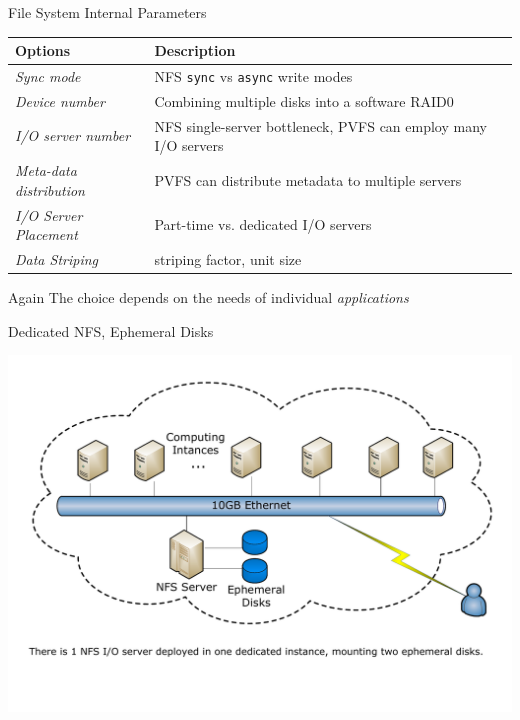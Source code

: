 \documentclass{beamer}
\begin{document}
\begin{frame}{File System Internal Parameters}
    \begin{tabular}{p{3.7cm}|p{6.3cm}}
        \toprule
        \textbf{Options} & \textbf{Description} \\
        \midrule
        \textit{Sync mode} &
            NFS \texttt{sync} vs \texttt{async} write modes \\
        \textit{Device number} &
            Combining multiple disks into a software RAID0 \\
        \textit{I/O server number} &
            NFS single-server bottleneck, PVFS can employ many I/O servers \\
        \textit{Meta-data distribution} &
            PVFS can distribute metadata to multiple servers \\
        \textit{I/O Server Placement} &
            Part-time vs. dedicated I/O servers \\
        \textit{Data Striping} & 
            striping factor, unit size\\
        \bottomrule
    \end{tabular}
    \vspace{.2cm}
    \pause
    \begin{block}{Again}
        The choice depends on the needs of individual \emph{applications}
    \end{block}
\end{frame}

\begin{frame}{Dedicated NFS, Ephemeral Disks}
    \begin{center}
        \includegraphics[width=\textwidth]{figures/visio/nfs-ephemeral.pdf}
    \end{center}
\end{frame}
\end{document}
